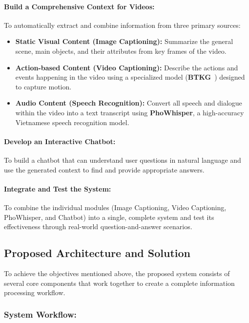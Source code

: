 \paragraph{Build a Comprehensive Context for Videos:} To automatically extract and combine information from three primary sources:

\begin{itemize}
    \item \textbf{Static Visual Content (Image Captioning):} Summarize the general scene, main objects, and their attributes from key frames of the video.
    
    \item \textbf{Action-based Content (Video Captioning):} Describe the actions and events happening in the video using a specialized model (\textbf{BTKG}~\cite{btkg}) designed to capture motion.
    
    \item \textbf{Audio Content (Speech Recognition):} Convert all speech and dialogue within the video into a text transcript using \textbf{PhoWhisper}, a high-accuracy Vietnamese speech recognition model.
\end{itemize}

\paragraph{Develop an Interactive Chatbot:} To build a chatbot that can understand user questions in natural language and use the generated context to find and provide appropriate answers.

\paragraph{Integrate and Test the System:} To combine the individual modules (Image Captioning, Video Captioning, PhoWhisper, and Chatbot) into a single, complete system and test its effectiveness through real-world question-and-answer scenarios.

\subsection{Proposed Architecture and Solution}

To achieve the objectives mentioned above, the proposed system consists of several core components that work together to create a complete information processing workflow.

\subsubsection*{System Workflow:}

